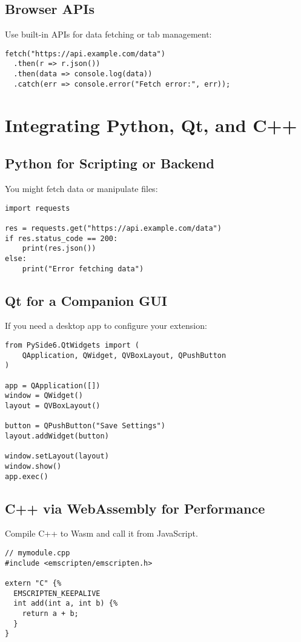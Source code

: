 \documentclass[12pt,a4paper]{article}
\begin{document}
\subsection{Browser APIs}
Use built-in APIs for data fetching or tab management:

\begin{verbatim}
fetch("https://api.example.com/data")
  .then(r => r.json())
  .then(data => console.log(data))
  .catch(err => console.error("Fetch error:", err));
\end{verbatim}

\section{Integrating Python, Qt, and C++}
\subsection{Python for Scripting or Backend}
You might fetch data or manipulate files:

\begin{verbatim}
import requests

res = requests.get("https://api.example.com/data")
if res.status_code == 200:
    print(res.json())
else:
    print("Error fetching data")
\end{verbatim}

\subsection{Qt for a Companion GUI}
If you need a desktop app to configure your extension:

\begin{verbatim}
from PySide6.QtWidgets import (
    QApplication, QWidget, QVBoxLayout, QPushButton
)

app = QApplication([])
window = QWidget()
layout = QVBoxLayout()

button = QPushButton("Save Settings")
layout.addWidget(button)

window.setLayout(layout)
window.show()
app.exec()
\end{verbatim}

\subsection{C++ via WebAssembly for Performance}
Compile C++ to Wasm and call it from JavaScript.

\begin{verbatim}
// mymodule.cpp
#include <emscripten/emscripten.h>

extern "C" {%
  EMSCRIPTEN_KEEPALIVE
  int add(int a, int b) {%
    return a + b;
  }
}
\end{verbatim}
\end{document}
